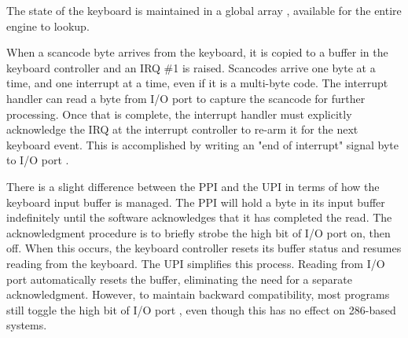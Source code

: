 \documentclass[book.tex]{subfiles}
\begin{document}
\par
\begin{minipage}{\textwidth}

\end{minipage}

\par
The state of the keyboard is maintained in a global array , available for the entire engine to lookup.\\
\par
\begin{minipage}{\textwidth}

\end{minipage}

\par
When a scancode byte arrives from the keyboard, it is copied to a buffer in the keyboard controller and an IRQ \#1 is raised. Scancodes arrive one byte at a time, and one interrupt at a time, even if it is a multi-byte code. The interrupt handler can read a byte from I/O port  to capture the scancode for further processing. Once that is complete, the interrupt handler must explicitly acknowledge the IRQ at the interrupt controller to re-arm it for the next keyboard event. This is accomplished by writing an "end of interrupt" signal byte to I/O port . \\

\par
There is a slight difference between the PPI and the UPI in terms of how the keyboard input buffer is managed. The PPI will hold a byte in its input buffer indefinitely until the software acknowledges that it has completed the read. The acknowledgment procedure is to briefly strobe the high bit of I/O port  on, then off. When this occurs, the keyboard controller resets its buffer status and resumes reading from the keyboard. The UPI simplifies this process. Reading from I/O port  automatically resets the buffer, eliminating the need for a separate acknowledgment. However, to maintain backward compatibility, most programs still toggle the high bit of I/O port , even though this has no effect on 286-based systems.\\

\par
\begin{minipage}{\textwidth}

\end{minipage}
\end{document}
